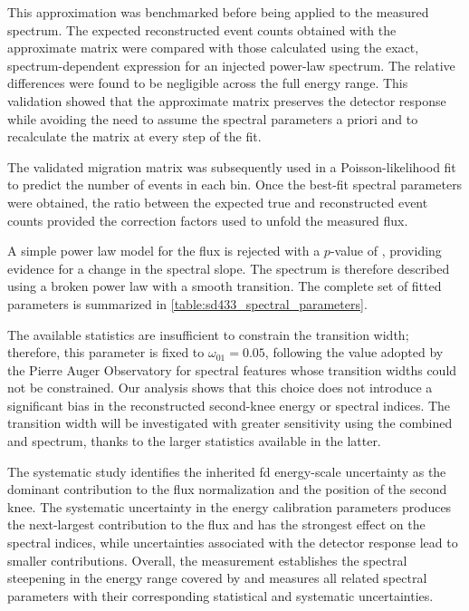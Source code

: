 \documentclass[main.tex]{subfiles}
\begin{document}
This approximation was benchmarked before being applied to the measured spectrum.
The expected reconstructed event counts obtained with the approximate matrix were compared with those calculated using the exact, spectrum-dependent expression for an injected power-law spectrum.
The relative differences were found to be negligible across the full energy range.
This validation showed that the approximate matrix preserves the detector response while avoiding the need to assume the spectral parameters a priori and to recalculate the matrix at every step of the fit.

The validated migration matrix was subsequently used in a Poisson-likelihood fit to predict the number of events in each bin.
Once the best-fit spectral parameters were obtained, the ratio between the expected true and reconstructed event counts provided the correction factors used to unfold the measured flux.

A simple power law model for the flux is rejected with a $p$-value of
\SDFourThreeThreePowerLawPValue, providing evidence for a change in the spectral slope.
The spectrum is therefore described using a broken power law with a smooth transition.
The complete set of fitted parameters is summarized in
\cref{table:sd433_spectral_parameters}.

The available  statistics are insufficient to constrain the transition width; therefore, this parameter is fixed to $\omega_{01}=0.05$, following the value adopted by the Pierre Auger Observatory for spectral features whose transition widths could not be constrained.
Our analysis shows that this choice does not introduce a significant bias in the reconstructed second-knee energy or spectral indices.
The transition width will be investigated with greater sensitivity using the combined  and  spectrum, thanks to the larger statistics available in the latter.

The systematic study identifies the inherited \gls{fd} energy-scale uncertainty as the dominant contribution to the flux normalization and the position of the second knee.
The systematic uncertainty in the  energy calibration parameters produces the next-largest contribution to the flux and has the strongest effect on the spectral indices, while uncertainties associated with the detector response lead to smaller contributions.
Overall, the measurement establishes the spectral steepening in the energy range covered by  and measures all related spectral parameters with their corresponding statistical and systematic uncertainties.
\end{document}
